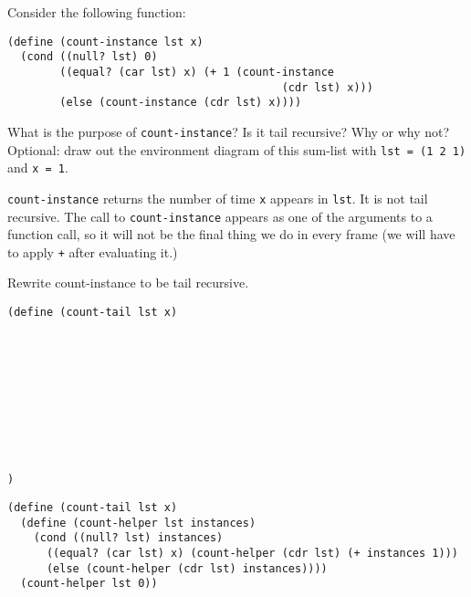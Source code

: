 \begin{blocksection}
\question Consider the following function:

\begin{lstlisting}
(define (count-instance lst x)
  (cond ((null? lst) 0)
        ((equal? (car lst) x) (+ 1 (count-instance 
                                          (cdr lst) x)))
        (else (count-instance (cdr lst) x))))
\end{lstlisting}

\vspace{2\baselineskip}

What is the purpose of \texttt{count-instance}? Is it tail recursive? Why or why not?
\newline
Optional: draw out the environment diagram of this sum-list with \texttt{lst = (1 2 1)} and \texttt{x = 1}.

\begin{solution}[0.5in]
\texttt{count-instance} returns the number of time \texttt{x} appears in \texttt{lst}. It is not tail recursive. The call to \texttt{count-instance} appears as one of the arguments to a function call, so it will not be the final thing we do in every frame (we will have to apply \texttt{+} after evaluating it.)
\end{solution}


\question Rewrite count-instance to be tail recursive.

\begin{lstlisting}
(define (count-tail lst x)










)
\end{lstlisting}

\begin{solution}[0.5in]
\begin{lstlisting}
(define (count-tail lst x)
  (define (count-helper lst instances)
    (cond ((null? lst) instances)
      ((equal? (car lst) x) (count-helper (cdr lst) (+ instances 1)))
      (else (count-helper (cdr lst) instances))))
  (count-helper lst 0))
\end{lstlisting}
\end{solution}

\end{blocksection}

